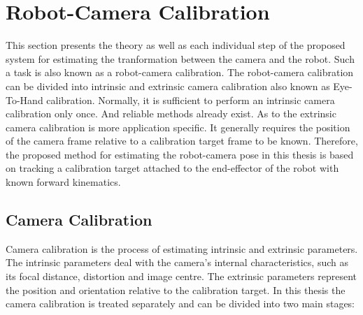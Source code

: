 
\chapter{Robot-Camera Calibration}
\label{chap:robot}
This section presents the theory as well as each individual step of the proposed system for estimating the tranformation between the camera and the robot. Such a task is also known as a robot-camera calibration. The robot-camera calibration can be divided into intrinsic and extrinsic camera calibration also known as Eye-To-Hand calibration. Normally, it is sufficient to perform an intrinsic camera calibration only once. And reliable methods already exist. As to the extrinsic camera calibration is more application specific. It generally requires the position of the camera frame relative to a calibration target frame to be known. Therefore, the proposed method for estimating the robot-camera pose in this thesis is based on tracking a calibration target attached to the end-effector of the robot with known forward kinematics. 


\section{Camera Calibration}

Camera calibration is the process of estimating intrinsic and extrinsic parameters. The intrinsic parameters deal with the camera's internal characteristics, such as its focal distance, distortion and image centre. The extrinsic parameters represent the position and orientation relative to the calibration target. In this thesis the camera calibration is treated separately and can be divided into two main stages:

